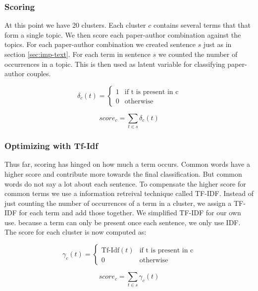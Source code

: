 \subsubsection*{Scoring}

At this point we have 20 clusters. Each cluster $c$ contains several terms that that form a single topic. We then score each paper-author combination against the topics. For each  paper-author combination we created sentence $s$ just as in section \ref{sec:imp-text}. For each term in sentence $s$ we counted the number of occurrences in a topic. This is then used as latent variable for classifying paper-
author couples.

\begin{multicols}{2}
\[ \delta_c(t) =\left\{ \begin{matrix} 1 & \mbox{if t is present in c} \\ 0 & \mbox{otherwise} \end{matrix} \right.\]

\[ score_c = \sum_{t \in s} \delta_c(t) \]
\end{multicols}

\subsubsection*{Optimizing with Tf-Idf}

Thus far, scoring has hinged on how much a term occurs. Common words have a higher score and contribute more towards the final classification. But common words do not say a lot about each sentence\cite{chowdhury2010introduction}. To compensate the higher score for common terms we use a information retreival technique called TF-IDF. Instead of just counting the number of occurrences of a term in a cluster, we assign a TF-IDF for each term and add those together. We simplified TF-IDF for our own use. because a term can only be present once each sentence, we only use IDF. The score for each cluster is now computed as:


\begin{multicols}{2}
\[ \gamma_c(t) =\left\{ \begin{matrix} \mbox{Tf-Idf}(t) & \mbox{if t is present in c} \\ 0 & \mbox{otherwise} \end{matrix} \right.\]


\[ score_c = \sum_{t \in s} \gamma_c(t) \]
\end{multicols}
